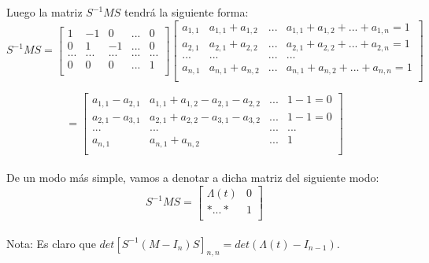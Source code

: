   Luego la matriz  $S^{-1}MS$ tendrá la siguiente forma:\\
     \[ S^{-1}MS = \begin{bmatrix}
     1 & -1 & 0 &... & 0 \\
     0 & 1 & -1 &...  & 0\\
     ... & ... & ...& ... & ... \\		
     0 & 0 & 0 & ... & 1\\
     \end{bmatrix} 
     \begin{bmatrix}
     a_{1,1} & a_{1,1}+a_{1,2} & ... & a_{1,1} + a_{1,2}+...+a_{1,n} = 1  \\
     a_{2,1} & a_{2,1}+a_{2,2} &... & a_{2,1} + a_{2,2}+...+a_{2,n} = 1  \\
     ... & ... & ... & ... \\	
     a_{n,1} & a_{n,1}+a_{n,2} & ... & a_{n,1} + a_{n,2}+...+a_{n,n} = 1 \\
     \end{bmatrix}\]
     
     \[= \begin{bmatrix}
     a_{1,1}-a_{2,1} & a_{1,1}+a_{1,2}-a_{2,1}-a_{2,2} & ... & 1-1 = 0  \\
     a_{2,1}-a_{3,1} & a_{2,1}+a_{2,2}-a_{3,1}-a_{3,2}&... & 1 - 1=0  \\
     ... & ... & ... & ... \\	
     a_{n,1} & a_{n,1}+a_{n,2} & ... & 1 \\
     \end{bmatrix}\]\\
     
     De un modo más simple, vamos a denotar a dicha matriz del siguiente modo:\\
     \[ S^{-1}MS = \left[\begin{array}{r|r}
     \Lambda (t) & 0 \\ \hline	
     * ... * & 1\\
     \end{array}\right]\]\\
  Nota:  Es claro que $ det[S^{-1}(M-I_{n})S]_{n,n} = det(\Lambda(t)-I_{n-1}) $.\\
  
